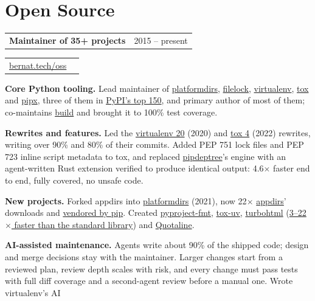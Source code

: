 \documentclass[10pt]{article}
\makeatletter
\newcommand{\entry}{\needspace{6\baselineskip}}
\newcommand{\twoColumns}[2]{%
  \noindent
  \begin{tabularx}{\textwidth}{@{}X r@{}}#2 & {\color{muted}#1}\\
  \end{tabularx}\par
}
\newcommand{\cvrule}{}
\makeatother
\begin{document}
\section*{Open Source}
\cvrule%
\entry%
\twoColumns{2015 -- present}{ \textbf{Maintainer of 35+ projects} }
\twoColumns{}{\href{https://bernat.tech/oss}{bernat.tech/oss}}

\begin{points}
\item \textbf{Core Python tooling.} Lead maintainer of \href{https://github.com/tox-dev/platformdirs}{platformdirs},
  \href{https://github.com/tox-dev/filelock}{filelock}, \href{https://github.com/pypa/virtualenv}{virtualenv},
  \href{https://github.com/tox-dev/tox}{tox} and \href{https://github.com/pypa/pipx}{pipx}, three of them in
  \href{https://hugovk.github.io/top-pypi-packages/}{PyPI's top 150}, and primary author of most of them; co-maintains
  \href{https://github.com/pypa/build}{build} and brought it to 100\% test coverage.
\item \textbf{Rewrites and features.} Led the \href{https://pypi.org/project/virtualenv/20.0.0/}{virtualenv 20}
  (2020) and \href{https://pypi.org/project/tox/4.0.0/}{tox 4} (2022) rewrites, writing over 90\% and 80\% of their
  commits. Added PEP 751 lock files and PEP 723 inline script metadata to tox, and replaced
  \href{https://github.com/tox-dev/pipdeptree}{pipdeptree}'s engine with an agent-written Rust extension verified to
  produce identical output: 4.6$\times$ faster end to end, fully covered, no unsafe code.
\item \textbf{New projects.} Forked appdirs into \href{https://github.com/tox-dev/platformdirs}{platformdirs} (2021),
  now 22$\times$ \href{https://pypi.org/project/appdirs/}{appdirs}' downloads and
  \href{https://github.com/pypa/pip/blob/main/src/pip/_vendor/vendor.txt}{vendored by pip}. Created
  \href{https://github.com/tox-dev/toml-fmt}{pyproject-fmt}, \href{https://github.com/tox-dev/tox-uv}{tox-uv},
  \href{https://github.com/tox-dev/turbohtml}{turbohtml}
  (\href{https://bernat.tech/posts/blazing-fast-html-parser/}{3--22$\times$ faster than the standard library}) and
  \href{https://github.com/quotaline/quotaline}{Quotaline}.
\item \textbf{AI-assisted maintenance.} Agents write about 90\% of the shipped code; design and
  merge decisions stay with
  the maintainer. Larger changes start from a reviewed plan, review depth scales with risk, and every change must
  pass tests with full diff coverage and a second-agent review before a manual one. Wrote virtualenv's AI

\end{points}
\end{document}
